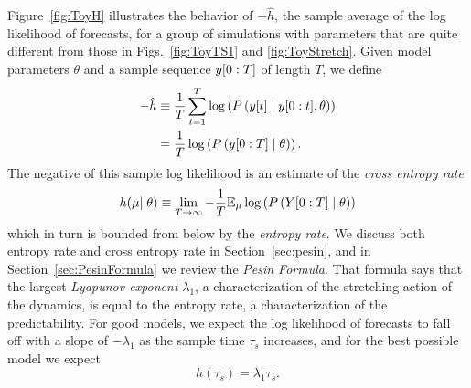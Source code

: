 Figure~\ref{fig:ToyH} illustrates the behavior of $-\hat h$, the sample
average of the log likelihood of forecasts, for a group of simulations
with parameters that are quite different from those in
Figs.~\ref{fig:ToyTS1} and \ref{fig:ToyStretch}.  Given model parameters
$\theta$ and a sample sequence $y[0:T]$ of length $T$, we define
\begin{align*}
  -\hat h &\equiv \frac{1}{T} \sum_{t=1}^T
    \log \left( P \left({y}{[t]}\mid y[0:t], \theta
      \right)\right)\\
    &=  \frac{1}{T} \log \left( P \left(y[0:T]\mid  \theta
      \right)\right).
\end{align*}
The negative of this sample log likelihood is an estimate of the
\emph{cross entropy rate} 
\begin{equation*}
  h(\mu||\theta) \equiv  \lim_{T \rightarrow \infty} - \frac{1}{T}
  \mathbb{E}_{\mu} \log \left( P \left(Y[0:T]\mid \theta \right) \right)
\end{equation*}
which in turn is bounded from below by the \emph{entropy rate}.  We
discuss both entropy rate and cross entropy rate in
Section~\ref{sec:pesin}, and in Section~\ref{sec:PesinFormula} we
review the \emph{Pesin Formula}.  That formula says that the largest
\emph{Lyapunov exponent} $\lambda_1$, a characterization of the
stretching action of the dynamics, is equal to the entropy rate, a
characterization of the predictability.  For good models, we expect
the log likelihood of forecasts to fall off with a slope of
$-\lambda_1$ as the sample time $\tau_s$ increases, and for the best
possible model we expect
\begin{equation}
  \label{eq:bound1}
  h(\tau_s) = \lambda_1 \tau_s.
\end{equation}

